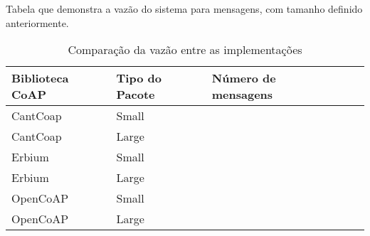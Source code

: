 Tabela que demonstra a vaz\~ao do sistema para mensagens, com tamanho definido anteriormente.

\begin{table}[h]
\label{throughputCoap}
\centering
\begin{tabular}{@{}lllll@{}}
\toprule
Biblioteca CoAP & Tipo do Pacote & N\'umero de mensagens &  \\ \midrule
CantCoap &  Small &  & \\
CantCoap &  Large &  & \\
Erbium &  Small &  &  \\
Erbium &  Large &  &  \\
OpenCoAP &  Small &  &  \\
OpenCoAP &  Large &  &  \\ \bottomrule
\end{tabular}
\caption{Compara\c{c}\~ao da vaz\~ao entre as  implementa\c{c}\~oes}
\end{table}

